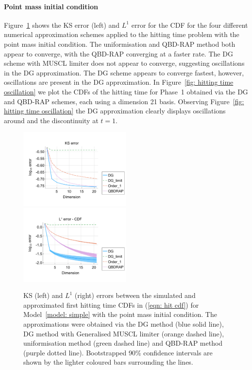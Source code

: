 \paragraph{Point mass initial condition}
Figure~\ref{fig: hitting time pm} shows the KS error (left) and \(L^1\) error for the CDF for the four different numerical approximation schemes applied to the hitting time problem with the point mass initial condition. The uniformisation and QBD-RAP method both appear to converge, with the QBD-RAP converging at a faster rate. The DG scheme with MUSCL limiter does not appear to converge, suggesting oscillations in the DG approximation. The DG scheme appears to converge fastest, however, oscillations are present in the DG approximation. In Figure~\ref{fig: hitting time oscillation} we plot the CDFs of the hitting time for Phase~1 obtained via the DG and QBD-RAP schemes, each using a dimension 21 basis. Observing Figure~\ref{fig: hitting time oscillation} the DG approximation clearly displays oscillations around and the discontinuity at \(t=1\). 
\begin{figure}[h]
	\centering
	\includegraphics[width=0.5\textwidth,trim={0.75cm 0.8cm 0.25cm 1.25cm},clip]{chapter6/figs/hitting_times_model/hitting_times/point_mass/ks_error_formatted.pdf}%
	\includegraphics[width=0.5\textwidth,trim={0.75cm 0.8cm 0.25cm 1.25cm},clip]{chapter6/figs/hitting_times_model/hitting_times/point_mass/l1_cdf_error_formatted.pdf}
	\caption{KS (left) and \(L^1\) (right) errors between the simulated and approximated first hitting time CDFs in (\ref{eqn: hit cdf}) for Model~\ref{model: simple} with the point mass initial condition. The approximations were obtained via the DG method (blue solid line), DG method with Generalised MUSCL limiter (orange dashed line), uniformisation method (green dashed line) and QBD-RAP method (purple dotted line). Bootstrapped 90\% confidence intervals are shown by the lighter coloured bars surrounding the lines.} 
	\label{fig: hitting time pm} 
\end{figure}
